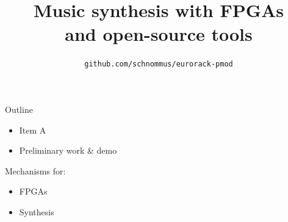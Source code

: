 \documentclass{beamer}
\title{Music synthesis with FPGAs \\and open-source tools}
\subtitle{}
\author{\texttt{github.com/schnommus/eurorack-pmod}}
\institute{Sebastian Holzapfel}
\date{}
\begin{document}
\maketitle

\setwatermark{}

\begin{frame}{Outline}

    \begin{itemize}
        \item Item A
        \item Preliminary work \& demo
    \end{itemize}

    \begin{block}{Mechanisms for:}
        \begin{itemize}
            \item FPGAs
            \item Synthesis
        \end{itemize}
    \end{block}

\end{frame}

\end{document}
